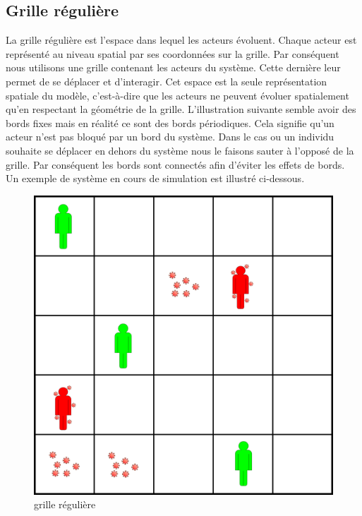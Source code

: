 \subsection{Grille régulière}

La grille régulière est l'espace dans lequel les acteurs évoluent. Chaque acteur est représenté au niveau spatial par ses coordonnées sur la grille. Par conséquent nous utilisons une grille contenant les acteurs du système. Cette dernière leur permet de se déplacer et d'interagir. Cet espace est la seule représentation spatiale du modèle, c'est-à-dire que les acteurs ne peuvent évoluer spatialement qu'en respectant la géométrie de la grille. L'illustration suivante semble avoir des bords fixes mais en réalité ce sont des bords périodiques. Cela signifie qu'un acteur n'est pas bloqué par un bord du système. Dans le cas ou un individu souhaite se déplacer en dehors du système nous le faisons sauter à l'opposé de la grille. Par conséquent les bords sont connectés afin d'éviter les effets de bords. \\

Un exemple de système en cours de simulation est illustré ci-dessous.\\

\begin{figure}[h]
\centering
\captionsetup{justification=centering}
\includegraphics[scale=0.5]{Images/grid.png}
\caption{grille régulière}
\end{figure}

